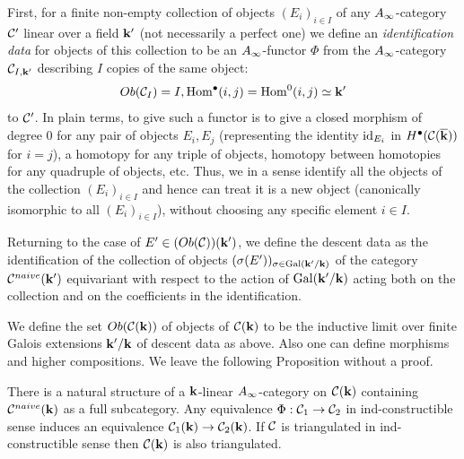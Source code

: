 \documentclass[12pt]{article}
\begin{document}
First, for a finite non-empty collection of objects $(E_i)_{i\in I}$ of any $A_{\infty}$-category ${\mathcal C}'$ linear over a field ${{\bf k}}'$ (not necessarily a perfect one)
we define an {\it identification data} for objects of this collection to be 
an $A_{\infty}$-functor $\Phi$ from the $A_{\infty}$-category ${\mathcal C}_{I,{{\bf k}}'}$ describing $I$ copies of the same object: 
$$Ob({\mathcal C}_I)=I, \operatorname{Hom}^\bullet(i,j) =\operatorname{Hom}^0(i,j)\simeq {{\bf k}}'  $$
 to ${\mathcal C}'$. In plain terms, to give such a functor is to give a closed morphism of degree 0 for any pair of objects $E_i,E_j$ (representing  the identity
 $\operatorname{id}_{E_i}$ in $H^\bullet({\mathcal C}({\overline{\bf k}}))$ for $i=j$), a homotopy for any triple of objects, homotopy between homotopies
 for any quadruple of objects, etc. Thus, we in a sense identify all the objects of the collection $(E_i)_{i\in I}$ and hence can treat it is a
 new object (canonically isomorphic to all $(E_i)_{i\in I}$), without choosing any specific element $i\in I$.

Returning to the case of $E'\in (Ob({\mathcal C}))({\bf k}')$, we define the descent data
 as the identification of the collection of objects $(\sigma(E'))_{\sigma\in \operatorname{Gal}({\bf k}'/{\bf k})}$ of the category ${\mathcal C}^{naive}({\bf k}')$
equivariant with respect to the action of $\operatorname{Gal}({\bf k}'/{\bf k})$ acting both on the collection and on the coefficients in the identification.
 
We define the set $Ob({\mathcal C}({\bf k}))$ of objects of ${\mathcal C}({\bf k})$ to be the inductive limit over finite Galois extensions ${\bf k}'/{\bf k}$ of descent data as above.
Also one can define morphisms and higher compositions. 
We leave the following Proposition without a proof.
\begin{prp} There is a natural structure of a ${\bf k}$-linear $A_{\infty}$-category on ${\mathcal C}({\bf k})$ containing ${\mathcal C}^{naive}({\bf k})$ as a full subcategory.
 Any equivalence $\Phi:{\mathcal C}_1\to {\mathcal C}_2$ in ind-constructible sense induces an equivalence ${\mathcal C}_1({\bf k})\to {\mathcal C}_2({\bf k})$.
 If ${\mathcal C}$ is triangulated in ind-constructible sense then ${\mathcal C}({\bf k})$ is also triangulated.
\end{prp}
\end{document}

